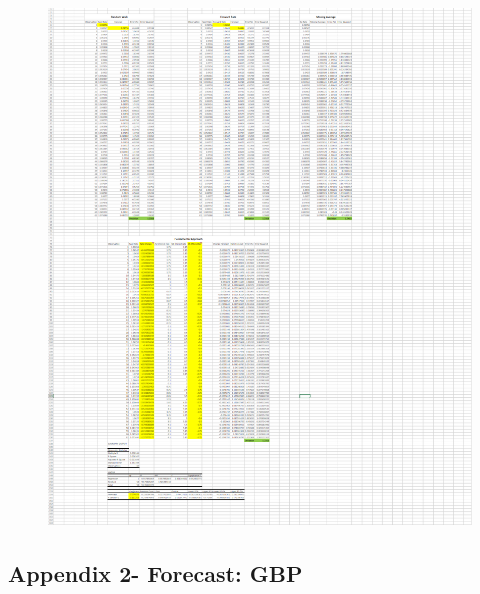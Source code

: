 \documentclass{article}
\let\Oldsubsection\subsection
\renewcommand{\subsection}{\FloatBarrier\Oldsubsection}
\begin{document}
\begin{figure}[h!]
    \centering
    \includegraphics[scale=0.5]{forecasts/NZD.png}
\end{figure}

\break

\subsection*{Appendix 2- Forecast: GBP}
\end{document}
